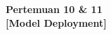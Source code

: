 \documentclass[a4paper,oneside,11pt]{book}
\newcommand{\Pertemuan}{10 \& 11}
\newcommand{\Materi}{Model Deployment}
\begin{document}

\renewcommand{\cfttoctitlefont}{\hfill\normalfont\LARGE\bfseries}
\renewcommand{\cftaftertoctitle}{\hfill}
\renewcommand{\cftbeforetoctitleskip}{1em}
\renewcommand{\cftaftertoctitleskip}{1.5em}

\renewcommand{\cftchappresnum}{Bab~}
\renewcommand{\cftchapaftersnum}{.}
\renewcommand{\cftchapnumwidth}{3.5em}
\renewcommand{\cftchapfont}{\bfseries}
\renewcommand{\cftchappagefont}{\bfseries}

\setlength{\cftbeforechapskip}{0.8em} %
\setlength{\cftbeforesecskip}{0.2em}  %
\renewcommand{\cftsecfont}{\normalfont}
\renewcommand{\cftsubsecfont}{\normalfont}

\renewcommand{\contentsname}{\centering Daftar Isi}
\renewcommand{\listfigurename}{\centering Daftar Gambar}
\renewcommand{\lstlistlistingname}{\centering Daftar Kode}

\renewcommand{\cftloftitlefont}{\hfill\normalfont\LARGE\bfseries}
\renewcommand{\cftafterloftitle}{\hfill}

\tableofcontents

\newpage
\listoffigures

\newpage
\lstlistoflistings

\newpage
\begin{center}
  \textbf{\LARGE Pertemuan \Pertemuan\\
  {[{\Materi}]}}
\end{center}
\end{document}
